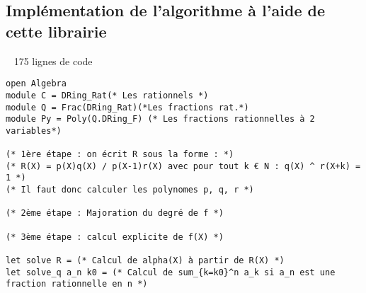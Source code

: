 \documentclass[17 pt,french]{scrartcl}
\begin{document}
  	\subsection*{Implémentation de l'algorithme à l'aide de cette librairie}
  	~ 175 lignes de code
  	\begin{lstlisting}
open Algebra
module C = DRing_Rat(* Les rationnels *)
module Q = Frac(DRing_Rat)(*Les fractions rat.*)
module Py = Poly(Q.DRing_F) (* Les fractions rationnelles à 2 variables*)

(* 1ère étape : on écrit R sous la forme : *)
(* R(X) = p(X)q(X) / p(X-1)r(X) avec pour tout k € N : q(X) ^ r(X+k) = 1 *)
(* Il faut donc calculer les polynomes p, q, r *)

(* 2ème étape : Majoration du degré de f *)

(* 3ème étape : calcul explicite de f(X) *)

let solve R = (* Calcul de alpha(X) à partir de R(X) *)
let solve_q a_n k0 = (* Calcul de sum_{k=k0}^n a_k si a_n est une fraction rationnelle en n *)
  	\end{lstlisting}
  	\newpage
\end{document}
